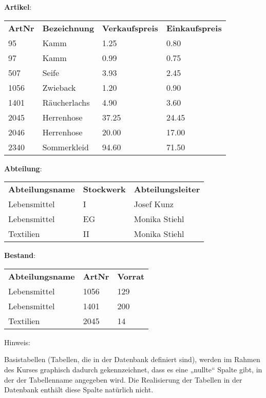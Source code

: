 \documentclass{lehramt-informatik-haupt}
\newcommand{\tmptabelle}[1]{
\bigskip
\par
\noindent
\textbf{#1}:
\bigskip
\par
\noindent
}
\begin{document}
\tmptabelle{Artikel}

\begin{tabular}{llll}
\textbf{ArtNr} & \textbf{Bezeichnung}  & \textbf{Verkaufspreis} & \textbf{Einkaufspreis} \\
95    & Kamm         & 1.25          & 0.80          \\
97    & Kamm         & 0.99          & 0.75          \\
507   & Seife        & 3.93          & 2.45          \\
1056  & Zwieback     & 1.20          & 0.90          \\
1401  & Räucherlachs & 4.90          & 3.60          \\
2045  & Herrenhose   & 37.25         & 24.45         \\
2046  & Herrenhose   & 20.00         & 17.00         \\
2340  & Sommerkleid  & 94.60         & 71.50
\end{tabular}

\tmptabelle{Abteilung}

\begin{tabular}{lll}
\textbf{Abteilungsname} & \textbf{Stockwerk} & \textbf{Abteilungsleiter} \\
Lebensmittel   & I         & Josef Kunz       \\
Lebensmittel   & EG        & Monika Stiehl    \\
Textilien      & II        & Monika Stiehl
\end{tabular}

\tmptabelle{Bestand}

\begin{tabular}{lll}
\textbf{Abteilungsname}  & \textbf{ArtNr} & \textbf{Vorrat} \\
Lebensmittel    & 1056  & 129    \\
Lebensmittel    & 1401  & 200    \\
Textilien       & 2045  & 14
\end{tabular}

Hinweis:

Basistabellen (Tabellen, die in der Datenbank definiert sind), werden im
Rahmen des Kurses graphisch dadurch gekennzeichnet, dass es eine
„nullte“ Spalte gibt, in der der Tabellenname angegeben wird. Die
Realisierung der Tabellen in der Datenbank enthält diese Spalte
natürlich nicht.

\renewcommand{\labelenumi}{\arabic{enumi}.}
\renewcommand{\labelenumii}{(\alph{enumii})}
\end{document}
